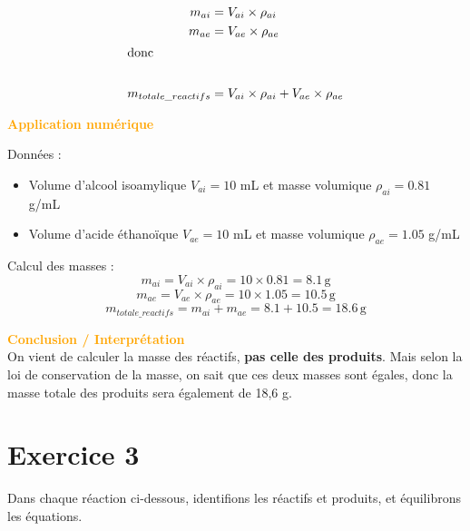 \documentclass[a4paper,12pt]{article}
\begin{document}
\begin{enumerate}[label=\textbf{\arabic*.}]
    \begin{align*}
      m_{ai} &= V_{ai} \times \rho_{ai} \\
      m_{ae} &= V_{ae} \times \rho_{ae} \\
      \intertext{donc} \\
      m_{totale\_reactifs} &= V_{ai} \times \rho_{ai} + V_{ae} \times \rho_{ae}
    \end{align*}
    
    \textcolor{orange}{\textbf{Application numérique}}

    Données :
    \begin{itemize}
        \item Volume d'alcool isoamylique $V_{ai} = 10$ mL et masse volumique $\rho_{ai} = 0.81$ g/mL
        \item Volume d'acide éthanoïque $V_{ae} = 10$ mL et masse volumique $\rho_{ae} = 1.05$ g/mL
    \end{itemize}

    Calcul des masses :
    \[
    m_{ai} = V_{ai} \times \rho_{ai} = 10 \times 0.81 = 8.1 \, \text{g}
    \]
    \[
    m_{ae} = V_{ae} \times \rho_{ae} = 10 \times 1.05 = 10.5 \, \text{g}
    \]
    \[
    m_{totale\_reactifs} = m_{ai} + m_{ae} = 8.1 + 10.5 = 18.6 \, \text{g}
    \]
  
  \textcolor{orange}{\textbf{Conclusion / Interprétation}} \\
  On vient de calculer la masse des réactifs, \textbf{pas celle des produits}. Mais selon la loi de conservation de la masse, on sait que ces deux masses sont égales, donc la masse totale des produits sera également de 18,6 g.

\end{enumerate}

\section{Exercice 3}

Dans chaque réaction ci-dessous, identifions les réactifs et produits, et équilibrons les équations.
\end{document}
